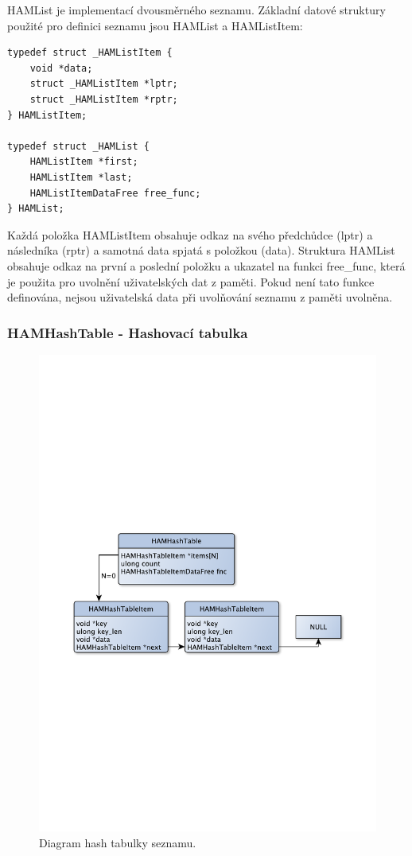 HAMList je implementací dvousměrného seznamu. Základní datové struktury použité pro definici seznamu jsou
HAMList a HAMListItem:

\begin{verbatim}
typedef struct _HAMListItem {
	void *data;
	struct _HAMListItem *lptr;
	struct _HAMListItem *rptr;
} HAMListItem;

typedef struct _HAMList {
	HAMListItem *first;
	HAMListItem *last;
	HAMListItemDataFree free_func;
} HAMList;
\end{verbatim}

Každá položka HAMListItem obsahuje odkaz na svého předchůdce (lptr) a následníka (rptr) a samotná data spjatá
s položkou (data). Struktura HAMList obsahuje odkaz na první a poslední položku a ukazatel na funkci free\_func,
která je použita pro uvolnění uživatelských dat z paměti. Pokud není tato funkce definována, nejsou uživatelská
data při uvolňování seznamu z paměti uvolněna.

\subsubsection{HAMHashTable - Hashovací tabulka}

\begin{figure}[h]
\centering
\includegraphics[trim=8cm 8cm 8cm 8cm, scale=0.6]{fig/hash}
\caption{Diagram hash tabulky seznamu.}
\label{fig:FigureExample}
\end{figure}

